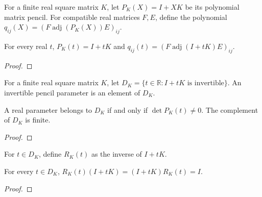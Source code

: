 \begin{supporting}
\begin{definition}
\label{def:matrix-polynomial-pencil}
\leanok
For a finite real square matrix $K$, let $P_K(X)=I+XK$ be its polynomial matrix pencil. For compatible real matrices $F,E$, define the polynomial $q_{ij}(X)=(F\operatorname{adj}(P_K(X))E)_{ij}$.
\end{definition}

\begin{theorem}
\label{thm:matrix-polynomial-pencil}
\leanok
For every real $t$, $P_K(t)=I+tK$ and $q_{ij}(t)=(F\operatorname{adj}(I+tK)E)_{ij}$.
\end{theorem}
\begin{proof}
\leanok
\end{proof}

\begin{definition}
\label{def:invertible-pencil-parameter}
\leanok
For a finite real square matrix $K$, let $D_K=\{t\in\mathbb R: I+tK\text{ is invertible}\}$. An invertible pencil parameter is an element of $D_K$.
\end{definition}

\begin{theorem}
\label{thm:invertible-pencil-parameter}
\leanok
A real parameter belongs to $D_K$ if and only if $\det P_K(t)\ne0$. The complement of $D_K$ is finite.
\end{theorem}
\begin{proof}
\leanok
\end{proof}

\begin{definition}
\label{def:inverse-pencil}
\leanok
For $t\in D_K$, define $R_K(t)$ as the inverse of $I+tK$.
\end{definition}

\begin{theorem}
\label{thm:inverse-pencil}
\leanok
For every $t\in D_K$, $R_K(t)(I+tK)=(I+tK)R_K(t)=I$.
\end{theorem}
\begin{proof}
\leanok
\end{proof}


\end{supporting}
